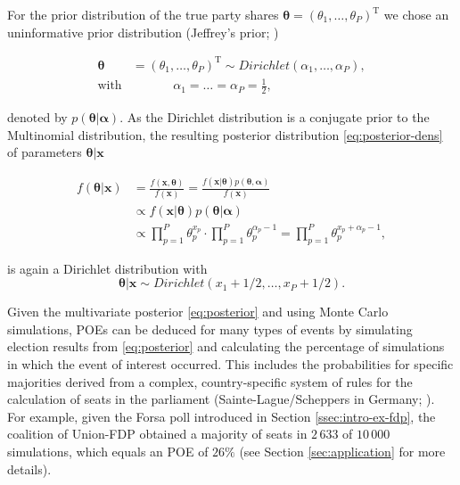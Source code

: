 \documentclass[smallcondensed]{svjour3}     %
\newcommand{\T}{\mathrm{\scriptscriptstyle T}}
\begin{document}
For the prior distribution of the true party shares $\boldsymbol{\theta}=(\theta_1,\ldots, \theta_P)^\T$
we chose an uninformative prior distribution
(Jeffrey's prior; \citet{gelman_2013})

\begin{equation}\label{eq:prior}
\begin{aligned}
\boldsymbol{\theta} &= (\theta_1,\ldots,\theta_P)^\T \sim Dirichlet(\alpha_1,\ldots,\alpha_P), \\
\text{with} &\ \ \ \ \ \ \ \ \ \ \ \ \ \ \ \alpha_1 = \ldots = \alpha_P = \frac{1}{2},
\end{aligned}
\end{equation}

denoted by $p(\boldsymbol{\theta}|\boldsymbol{\alpha})$.
As the Dirichlet distribution is a conjugate prior to the Multinomial distribution,
the resulting posterior distribution \eqref{eq:posterior-dens}  of parameters $\boldsymbol{\theta}|\mathbf{x}$

\begin{align}
f(\boldsymbol{\theta}|\mathbf{x})
  & = \frac{f(\mathbf{x}, \boldsymbol{\theta})}{f(\mathbf{x})}
    = \frac{f(\mathbf{x}|\boldsymbol{\theta})p(\boldsymbol{\theta}, \boldsymbol{\alpha})}{f(\mathbf{x})}\label{eq:posterior-dens}\\
  & \propto f(\mathbf{x}|\boldsymbol{\theta})p(\boldsymbol{\theta}|\boldsymbol{\alpha})\\
  & \propto \prod_{p=1}^{P}\theta_p^{x_p}\cdot \prod_{p=1}^{P}\theta_p^{\alpha_{p}-1} = \prod_{p=1}^{P}\theta_p^{x_p + \alpha_p-1},
\end{align}

is again a Dirichlet distribution with
\begin{equation}\label{eq:posterior}
\boldsymbol{\theta}|\mathbf{x} \sim Dirichlet(x_1 + 1/2,\ldots, x_P + 1/2).
\end{equation}

Given the multivariate posterior \eqref{eq:posterior} and using Monte Carlo
simulations, POEs can be deduced for many types of events by simulating
election results from \eqref{eq:posterior} and calculating the percentage of
simulations in which the event of interest occurred. This includes the
probabilities for specific majorities derived from a complex, country-specific
system of rules for the calculation of seats in the parliament
(Sainte-Lague/Scheppers in Germany; \citet{grofman_2003}). For example, given the
Forsa poll introduced in Section \ref{ssec:intro-ex-fdp}, the coalition of Union-FDP
obtained a majority of seats in $2\,633$ of $10\,000$ simulations, which equals
an POE of $26\%$ (see Section \ref{sec:application} for more details).\\
\end{document}
